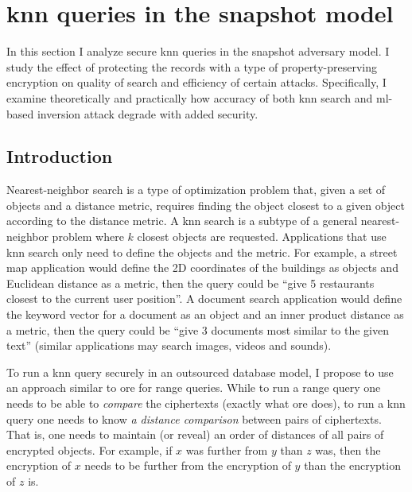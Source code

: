 \chapter{\texorpdfstring{\acrshort{knn}}{kNN} queries in the snapshot model}\label{section:knn-snapshot}
\thispagestyle{myheadings}

	In this section I analyze secure \acrshort{knn} queries in the snapshot adversary model.
	I study the effect of protecting the records with a type of property-preserving encryption on quality of search and efficiency of certain attacks.
	Specifically, I examine theoretically and practically how accuracy of both \acrshort{knn} search and \acrshort{ml}-based inversion attack degrade with added security.

	\section{Introduction}

		Nearest-neighbor search is a type of optimization problem that, given a set of objects and a distance metric, requires finding the object closest to a given object according to the distance metric.
		A \acrfull{knn} search is a subtype of a general nearest-neighbor problem where $k$ closest objects are requested.
		Applications that use \acrshort{knn} search only need to define the objects and the metric.
		For example, a street map application would define the 2D coordinates of the buildings as objects and Euclidean distance as a metric, then the query could be ``give 5 restaurants closest to the current user position''.
		A document search application would define the keyword vector for a document as an object and an inner product distance as a metric, then the query could be ``give 3 documents most similar to the given text'' (similar applications may search images, videos and sounds).

		To run a \acrshort{knn} query securely in an outsourced database model, I propose to use an approach similar to \acrshort{ore} for range queries.
		While to run a range query one needs to be able to \emph{compare} the ciphertexts (exactly what \acrshort{ore} does), to run a \acrshort{knn} query one needs to know \emph{a distance comparison} between pairs of ciphertexts.
		That is, one needs to maintain (or reveal) an order of distances of all pairs of encrypted objects.
		For example, if $x$ was further from $y$ than $z$ was, then the encryption of $x$ needs to be further from the encryption of $y$ than the encryption of $z$ is.

